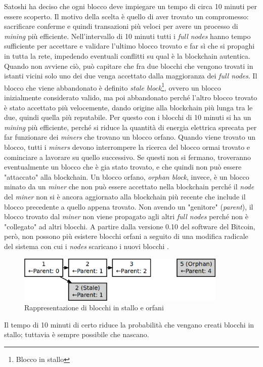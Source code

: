 \documentclass {article}
\begin{document}
Satoshi ha deciso che ogni blocco deve impiegare un tempo di circa 10 minuti per essere scoperto.
Il motivo della scelta è quello di aver trovato un compromesso: sacrificare conferme e quindi transazioni più veloci per avere un processo di \textit{mining} più efficiente.
Nell'intervallo di 10 minuti tutti i \textit{full nodes} hanno tempo sufficiente per accettare e validare l'ultimo blocco trovato e far sì che si propaghi in tutta la rete, impedendo eventuali conflitti su qual è la blockchain autentica.
Quando non avviene ciò, può capitare che fra due blocchi che vengono trovati in istanti vicini solo uno dei due venga accettato dalla maggioranza dei \textit{full nodes}.
Il blocco che viene abbandonato è definito \textit{stale block}\footnote{Blocco in stallo}, ovvero un blocco inizialmente considerato valido, ma poi abbandonato perché l'altro blocco trovato è stato accettato più velocemente, dando origine alla blockchain più lunga tra le due, quindi quella più reputabile.
Per questo con i blocchi di 10 minuti si ha un \textit{mining} più efficiente, perché si riduce la quantità di energia elettrica sprecata per far funzionare dei \textit{miners} che trovano un blocco orfano.
Quando viene trovato un blocco, tutti i \textit{miners} devono interrompere la ricerca del blocco ormai trovato e cominciare a lavorare su quello successivo.
Se questi non si fermano, troveranno eventualmente un blocco che è gia stato trovato, e che quindi non può essere "attaccato" alla blockchain.
Un blocco orfano, \textit{orphan block}, invece, è un blocco minato da un \textit{miner} che non può essere accettato nella blockchain perché il \textit{node} del \textit{miner} non si è ancora aggiornato alla blockchain più recente che include il blocco precedente a quello appena trovato.
Non avendo un "genitore" (\textit{parent}), il blocco trovato dal \textit{miner} non viene propagato agli altri \textit{full nodes} perché non è "collegato" ad altri blocchi.
A partire dalla versione 0.10 del software del Bitcoin, però, non possono più esistere blocchi orfani a seguito di una modifica radicale del sistema con cui i \textit{nodes} scaricano i nuovi blocchi \cite{staleorphans}.

\vspace {0.5cm}
\begin{figure}[htb!]
\includegraphics [width = 10cm] {stale-orphan.png}
\centering
\caption {Rappresentazione di blocchi in stallo e orfani}
\end{figure}
\vspace {0.2cm}
\noindent
%
Il tempo di 10 minuti di certo riduce la probabilità che vengano creati blocchi in stallo; tuttavia è sempre possibile che nascano.
\end{document}
